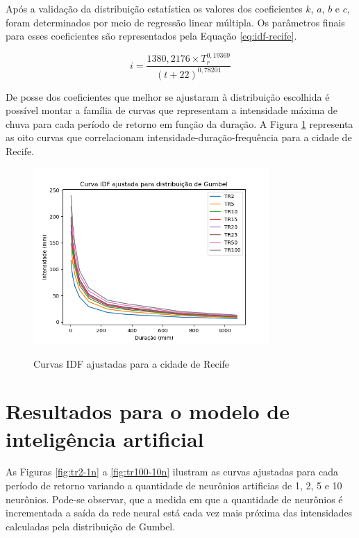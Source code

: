Após a validação da distribuição estatística os valores dos coeficientes $k$, $a$, $b$ e $c$, foram determinados por meio de regressão linear múltipla. Os parâmetros finais para esses coeficientes são representados pela Equação \ref{eq:idf-recife}.

\begin{equation}
    i = \frac{1380,2176\times T_r^{0,19369}}{(t+22)^{0,78201}}
\label{eq:idf-recife}
\end{equation}

De posse dos coeficientes que melhor se ajustaram à distribuição escolhida é possível montar a família de curvas que representam a intensidade máxima de chuva para cada período de retorno em função da duração. A Figura \ref{fig:idf-ajustada} representa as oito curvas que correlacionam intensidade-duração-frequência para a cidade de Recife.

\begin{figure}[h]
    \caption{Curvas IDF ajustadas para a cidade de Recife}
    \centering
    \includegraphics[width=0.8\textwidth]{Textuais/Figuras/curvas-idf-ajustadas.png}
    \label{fig:idf-ajustada}
\end{figure}

\section{Resultados para o modelo de inteligência artificial}

As Figuras \ref{fig:tr2-1n} a \ref{fig:tr100-10n} ilustram as curvas ajustadas para cada período de retorno variando a quantidade de neurônios artificias de 1, 2, 5 e 10 neurônios. Pode-se observar, que a medida em que a quantidade de neurônios é incrementada a saída da rede neural está cada vez mais próxima das intensidades calculadas pela distribuição de Gumbel.

